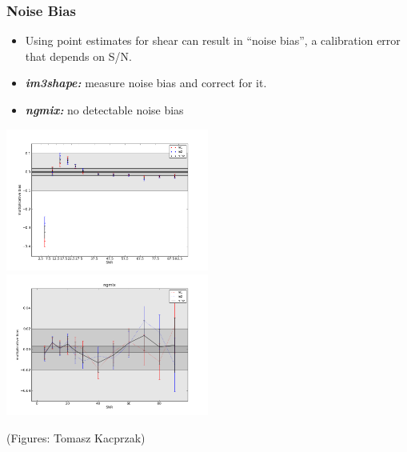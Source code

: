 \documentclass{beamer}
\begin{document}
\frame
{
    \frametitle{Noise Bias}

    \begin{itemize}

        \item Using point estimates for shear can result in ``noise bias'', a
            calibration error that depends on S/N.

        \item {\bf {\em im3shape:}}  measure noise bias and correct for it.

        \item {\bf {\em ngmix:}} no detectable noise bias

    \end{itemize}

    \begin{center}
        \includegraphics[width=0.5\textwidth]{noise-bias-im3shape.png}
        \includegraphics[width=0.5\textwidth]{noise-bias-ngmix.png}
    \end{center}
    {\tiny (Figures: Tomasz Kacprzak)}
}
\end{document}

